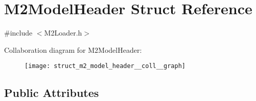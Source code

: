 \hypertarget{struct_m2_model_header}{\section{M2\+Model\+Header Struct Reference}
\label{struct_m2_model_header}
}


{\ttfamily \#include $<$M2\+Loader.\+h$>$}



Collaboration diagram for M2\+Model\+Header\+:\nopagebreak
\begin{figure}[H]
\begin{center}
\leavevmode
\texttt{[image: struct\_m2\_model\_header\_\_coll\_\_graph]}
\end{center}
\end{figure}
\subsection*{Public Attributes}
